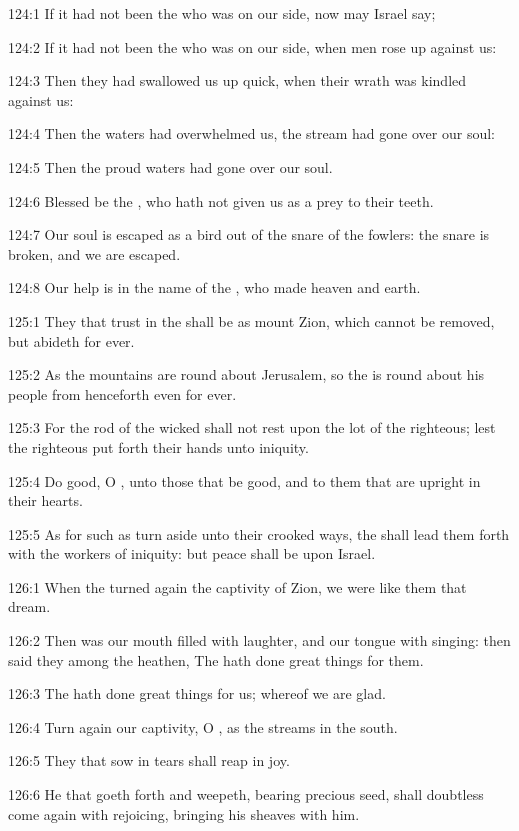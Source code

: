 124:1 If it had not been the \LORD who was on our side, now may Israel
say;

124:2 If it had not been the \LORD who was on our side, when men rose
up against us:

124:3 Then they had swallowed us up quick, when their wrath was
kindled against us:

124:4 Then the waters had overwhelmed us, the stream had gone over our
soul:

124:5 Then the proud waters had gone over our soul.

124:6 Blessed be the \LORD, who hath not given us as a prey to their
teeth.

124:7 Our soul is escaped as a bird out of the snare of the fowlers:
the snare is broken, and we are escaped.

124:8 Our help is in the name of the \LORD, who made heaven and earth.



125:1 They that trust in the \LORD shall be as mount Zion, which cannot
be removed, but abideth for ever.

125:2 As the mountains are round about Jerusalem, so the \LORD is round
about his people from henceforth even for ever.

125:3 For the rod of the wicked shall not rest upon the lot of the
righteous; lest the righteous put forth their hands unto iniquity.

125:4 Do good, O \LORD, unto those that be good, and to them that are
upright in their hearts.

125:5 As for such as turn aside unto their crooked ways, the \LORD
shall lead them forth with the workers of iniquity: but peace shall be
upon Israel.



126:1 When the \LORD turned again the captivity of Zion, we were like
them that dream.

126:2 Then was our mouth filled with laughter, and our tongue with
singing: then said they among the heathen, The \LORD hath done great
things for them.

126:3 The \LORD hath done great things for us; whereof we are glad.

126:4 Turn again our captivity, O \LORD, as the streams in the south.

126:5 They that sow in tears shall reap in joy.

126:6 He that goeth forth and weepeth, bearing precious seed, shall
doubtless come again with rejoicing, bringing his sheaves with him.



